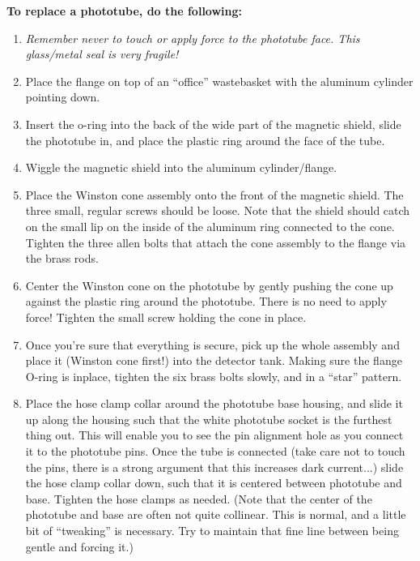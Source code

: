 	{\bf To replace a phototube, do the following:}
\begin{enumerate}

\item  {\em Remember never to touch or apply force to the phototube face.  This
glass/metal seal is very fragile!}

\item  Place the flange on top of an ``office'' wastebasket with the aluminum
cylinder pointing down.

\item  Insert the o-ring into the back of the wide part of the magnetic
shield, slide the phototube in, and place the plastic ring around the
face of the tube.

\item  Wiggle the magnetic shield into the aluminum cylinder/flange.

\item  Place the Winston cone assembly onto the front of the magnetic
shield.  The three small, regular screws should be loose.  Note that
the shield should catch on the small lip on the inside of the aluminum
ring connected to the cone.  Tighten the three allen bolts that attach
the cone assembly to the flange via the brass rods.

\item Center the Winston cone on the phototube by gently pushing the cone
up against the plastic ring around the phototube.  There is no need to
apply force!  Tighten the small screw holding the cone in place.

\item Once you're sure that everything is secure, pick up the whole
assembly and place it (Winston cone first!) into the detector tank.
Making sure the flange O-ring is inplace, tighten the six brass bolts
slowly, and in a ``star'' pattern.

\item Place the hose clamp collar around the phototube base housing, and
slide it up along the housing such that the white phototube socket is
the furthest thing out.  This will enable you to see the pin alignment
hole as you connect it to the phototube pins.  Once the tube is
connected (take care not to touch the pins, there is a strong argument
that this increases dark current...) slide the hose clamp collar down,
such that it is centered between phototube and base.  Tighten the hose
clamps as needed.  (Note that the center of the phototube and base are
often not quite collinear.  This is normal, and a little bit of
``tweaking'' is necessary.  Try to maintain that fine line between being
gentle and forcing it.)
\end{enumerate}

